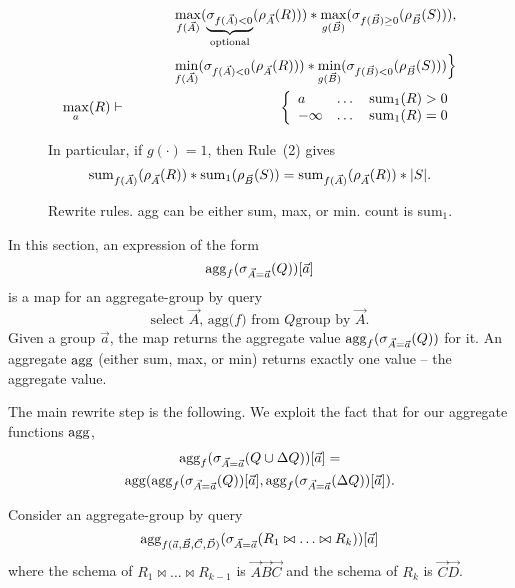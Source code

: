 \documentclass[10pt,twocolumn]{article}
\begin{document}
\begin{figure*}
\begin{eqnarray}
\nonumber\\
&& \quad\quad\;\;\,
\max_{f(\vec{A})}(\underbrace{\sigma_{f(\vec{A}) < 0}}_{\mathrm{optional}}(\rho_{\vec{A}}(R))) *
\max_{g(\vec{B})}(\sigma_{f(\vec{B}) \ge 0}(\rho_{\vec{B}}(S))),
\nonumber\\
&& \quad\quad\;\;\,
\min_{f(\vec{A})}(\sigma_{f(\vec{A}) < 0}(\rho_{\vec{A}}(R))) *
\min_{g(\vec{B})}(\sigma_{f(\vec{B}) < 0}(\rho_{\vec{B}}(S)))
\Big\}
\label{r11}
\\
\max_a(R)
&\vdash&
\left\{
\begin{array}{lll}
a       & \dots & \mathrm{sum}_1(R) > 0 \\
-\infty & \dots & \mathrm{sum}_1(R) = 0 \\
\end{array}
\right.
\label{r12}
\end{eqnarray}

In particular, if $g(\cdot) = 1$, then Rule~(2) gives
\[
\mathrm{sum}_{f(\vec{A})}(\rho_{\vec{A}}(R)) *
\mathrm{sum}_{1}(\rho_{\vec{B}}(S))
=
\mathrm{sum}_{f(\vec{A})}(\rho_{\vec{A}}(R)) * |S|.
\]

\caption{Rewrite rules. agg can be either sum, max, or min.
count is sum$_1$.}
\label{fig:rules}
\end{figure*}



In this section, an expression of the form
\[
\mathrm{agg}_f(\sigma_{\vec{A}=\vec{a}}(Q))[\vec{a}]
\]
is a map for an aggregate-group by query
\[
\mbox{select $\vec{A}$, agg($f$)
from $Q$
group by $\vec{A}$}.
\]
Given a group $\vec{a}$, the map returns
the aggregate value
$\mathrm{agg}_f(\sigma_{\vec{A}=\vec{a}}(Q))$ for it.
An aggregate $\mathrm{agg}$ (either sum, max, or min) returns exactly
one value -- the aggregate value.

The main rewrite step is the following.
We exploit the fact that for our aggregate functions $\mathrm{agg}$,
\begin{multline*}
\mathrm{agg}_f(\sigma_{\vec{A}=\vec{a}}(Q \cup \Delta Q))[\vec{a}]
= \\
\mathrm{agg}(\mathrm{agg}_f(\sigma_{\vec{A}=\vec{a}}(Q))[\vec{a}],
\mathrm{agg}_f(\sigma_{\vec{A}=\vec{a}}(\Delta Q))[\vec{a}]).
\end{multline*}


Consider an aggregate-group by query
\[
\mathrm{agg}_{f(\vec{a}, \vec{B}, \vec{C}, \vec{D})}
(\sigma_{\vec{A}=\vec{a}}(R_1 \bowtie \dots \bowtie R_k))[\vec{a}]
\]
where the schema of $R_1 \bowtie \dots \bowtie R_{k-1}$ is
$\vec{A}\vec{B}\vec{C}$ and the schema of
$R_k$ is $\vec{C}\vec{D}$.
\end{document}
